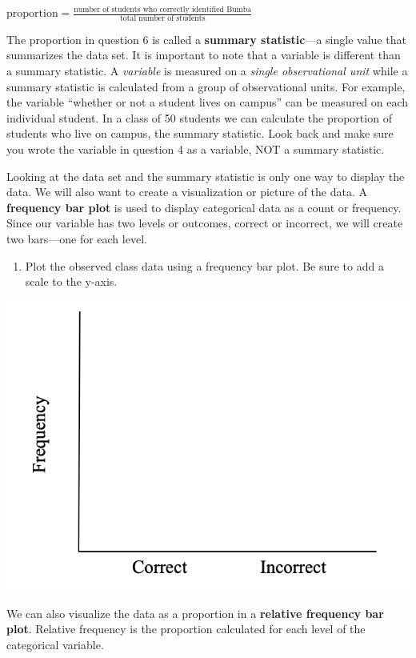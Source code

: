 \documentclass[
]{report}
\providecommand{\tightlist}{%
  \setlength{\itemsep}{0pt}\setlength{\parskip}{0pt}}
\begin{document}
\begin{center}
$\mbox{proportion} = \frac{\mbox{number of students who correctly identified Bumba}}{\mbox{total number of students}}$
\end{center}

\vspace{0.7in}

The proportion in question 6 is called a \textbf{summary statistic}---a single value that summarizes the data set. It is important to note that a variable is different than a summary statistic. A \emph{variable} is measured on a \emph{single observational unit} while a summary statistic is calculated from a group of observational units. For example, the variable ``whether or not a student lives on campus'' can be measured on each individual student. In a class of 50 students we can calculate the proportion of students who live on campus, the summary statistic. Look back and make sure you wrote the variable in question 4 as a variable, NOT a summary statistic.

Looking at the data set and the summary statistic is only one way to display the data. We will also want to create a visualization or picture of the data. A \textbf{frequency bar plot} is used to display categorical data as a count or frequency. Since our variable has two levels or outcomes, correct or incorrect, we will create two bars---one for each level.

\begin{enumerate}
\def\labelenumi{\arabic{enumi}.}
\setcounter{enumi}{6}
\tightlist
\item
  Plot the observed class data using a frequency bar plot. Be sure to add a scale to the y-axis.
\end{enumerate}

\begin{center}\includegraphics[width=0.4\linewidth]{images/barplot_martian} \end{center}

We can also visualize the data as a proportion in a \textbf{relative frequency bar plot}. Relative frequency is the proportion calculated for each level of the categorical variable.
\end{document}
